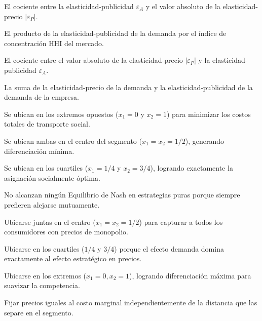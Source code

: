 \begin{opts}
    \item El cociente entre la elasticidad-publicidad $\varepsilon_A$ y el valor absoluto de la elasticidad-precio $|\varepsilon_P|$.
    \item El producto de la elasticidad-publicidad de la demanda por el índice de concentración HHI del mercado.
    \item El cociente entre el valor absoluto de la elasticidad-precio $|\varepsilon_P|$ y la elasticidad-publicidad $\varepsilon_A$.
    \item La suma de la elasticidad-precio de la demanda y la elasticidad-publicidad de la demanda de la empresa.
\end{opts}

\begin{opts}
    \item Se ubican en los extremos opuestos ($x_1 = 0$ y $x_2 = 1$) para minimizar los costos totales de transporte social.
    \item Se ubican ambas en el centro del segmento ($x_1 = x_2 = 1/2$), generando diferenciación mínima.
    \item Se ubican en los cuartiles ($x_1 = 1/4$ y $x_2 = 3/4$), logrando exactamente la asignación socialmente óptima.
    \item No alcanzan ningún Equilibrio de Nash en estrategias puras porque siempre prefieren alejarse mutuamente.
\end{opts}

\begin{opts}
    \item Ubicarse juntas en el centro ($x_1 = x_2 = 1/2$) para capturar a todos los consumidores con precios de monopolio.
    \item Ubicarse en los cuartiles ($1/4$ y $3/4$) porque el efecto demanda domina exactamente al efecto estratégico en precios.
    \item Ubicarse en los extremos ($x_1 = 0, x_2 = 1$), logrando diferenciación máxima para suavizar la competencia.
    \item Fijar precios iguales al costo marginal independientemente de la distancia que las separe en el segmento.
\end{opts}

